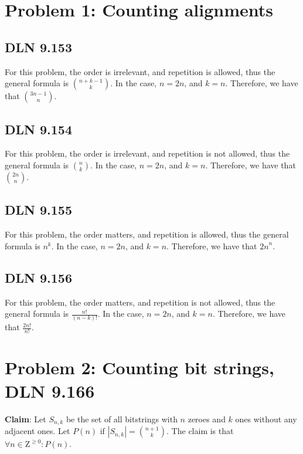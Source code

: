 \documentclass[titlepage]{article}
\begin{document}
 \maketitle

\section{Problem 1: Counting alignments}

\subsection{DLN 9.153}

For this problem, the order is irrelevant, and repetition is allowed, thus the general formula is ${n+k-1}\choose{k}$. In the case, $n=2n$, and $k=n$. Therefore, we have that ${3n-1}\choose{n}$.

\subsection{DLN 9.154}

For this problem, the order is irrelevant, and repetition is not allowed, thus the general formula is ${n}\choose{k}$. In the case, $n=2n$, and $k=n$. Therefore, we have that ${2n}\choose{n}$.

\subsection{DLN 9.155}

For this problem, the order matters, and repetition is allowed, thus the general formula is $n^k$. In the case, $n=2n$, and $k=n$. Therefore, we have that ${2n}^n$.

\subsection{DLN 9.156}

For this problem, the order matters, and repetition is not allowed, thus the general formula is $\frac{n!}{(n-k)!}$. In the case, $n=2n$, and $k=n$. Therefore, we have that $\frac{2n!}{n!}$.

\section{Problem 2: Counting bit strings, DLN 9.166}

\textbf{Claim}: Let $S_{n,k}$ be the set of all bitstrings with $n$ zeroes and $k$ ones without any adjacent ones. Let $P(n)$ if $|S_{n,k}| = {{n+1}\choose{k}}$.  The claim is that $\forall n \in \mathrm{Z}^{\geq 0}: P(n)$.
\end{document}
